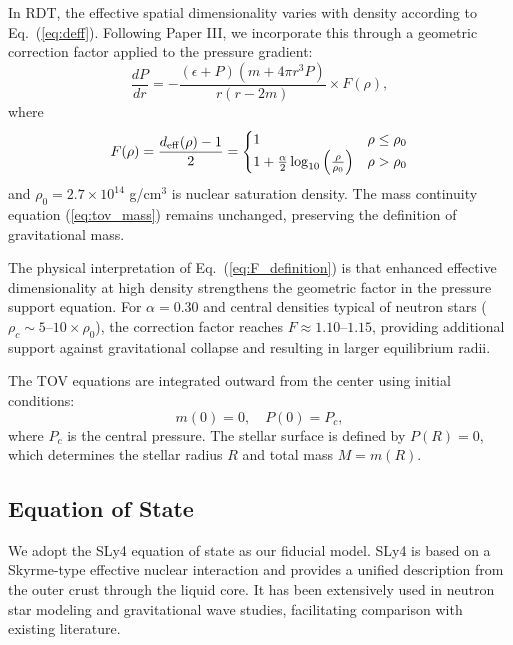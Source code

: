 \documentclass[twocolumn,showpacs,preprintnumbers,amsmath,amssymb,prd]{revtex4-2}
\begin{document}
In RDT, the effective spatial dimensionality varies with density according to Eq.~(\ref{eq:deff}). Following Paper III, we incorporate this through a geometric correction factor applied to the pressure gradient:
\begin{equation}
\frac{dP}{dr} = -\frac{(\epsilon + P)(m + 4\pi r^3 P)}{r(r - 2m)} \times F(\rho),
\label{eq:tov_rdt}
\end{equation}
where
\begin{equation}
F(\rho) = \frac{d_{\rm eff}(\rho) - 1}{2} = \begin{cases}
1 & \rho \leq \rho_0 \\
1 + \frac{\alpha}{2}\log_{10}\left(\frac{\rho}{\rho_0}\right) & \rho > \rho_0
\end{cases}
\label{eq:F_definition}
\end{equation}
and $\rho_0 = 2.7 \times 10^{14}$ g/cm$^3$ is nuclear saturation density. The mass continuity equation (\ref{eq:tov_mass}) remains unchanged, preserving the definition of gravitational mass.

The physical interpretation of Eq.~(\ref{eq:F_definition}) is that enhanced effective dimensionality at high density strengthens the geometric factor in the pressure support equation. For $\alpha = 0.30$ and central densities typical of neutron stars ($\rho_c \sim 5$--$10 \times \rho_0$), the correction factor reaches $F \approx 1.10$--$1.15$, providing additional support against gravitational collapse and resulting in larger equilibrium radii.

The TOV equations are integrated outward from the center using initial conditions:
\begin{equation}
m(0) = 0, \quad P(0) = P_c,
\end{equation}
where $P_c$ is the central pressure. The stellar surface is defined by $P(R) = 0$, which determines the stellar radius $R$ and total mass $M = m(R)$.

\subsection{Equation of State}
\label{sec:methods_eos}

We adopt the SLy4 equation of state \cite{Douchin2001} as our fiducial model. SLy4 is based on a Skyrme-type effective nuclear interaction and provides a unified description from the outer crust through the liquid core. It has been extensively used in neutron star modeling and gravitational wave studies, facilitating comparison with existing literature.
\end{document}
